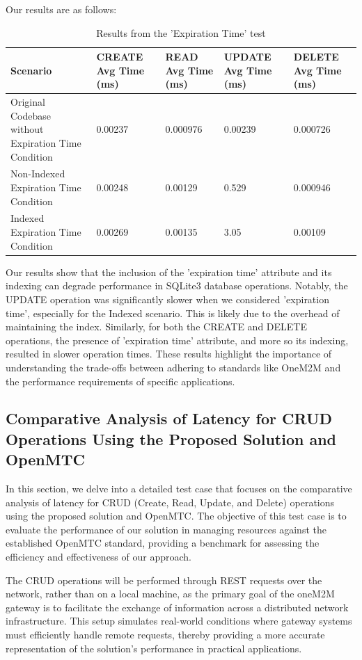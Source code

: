 \documentclass[a4paper,fleqn]{cas-dc}
\begin{document}
Our results are as follows:

\begin{table}[h]
\scriptsize
\centering
\caption{Results from the 'Expiration Time' test}
\begin{tabular}{l p{2cm} p{2cm} p{2cm} p{2cm}}
\hline
\textbf{Scenario} & \textbf{CREATE Avg Time (ms)} & \textbf{READ Avg Time (ms)} & \textbf{UPDATE Avg Time (ms)} & \textbf{DELETE Avg Time (ms)}\\ \hline \hline
Original Codebase without Expiration Time Condition & 0.00237 & 0.000976 & 0.00239 & 0.000726\\
Non-Indexed Expiration Time Condition & 0.00248 & 0.00129 & 0.529 & 0.000946\\ 
Indexed Expiration Time Condition & 0.00269 & 0.00135 & 3.05 & 0.00109\\ \hline
\end{tabular}
\end{table}


Our results show that the inclusion of the 'expiration time' attribute and its indexing can degrade performance in SQLite3 database operations. Notably, the UPDATE operation was significantly slower when we considered 'expiration time', especially for the Indexed scenario. This is likely due to the overhead of maintaining the index. Similarly, for both the CREATE and DELETE operations, the presence of 'expiration time' attribute, and more so its indexing, resulted in slower operation times. These results highlight the importance of understanding the trade-offs between adhering to standards like OneM2M and the performance requirements of specific applications. 

\subsection{Comparative Analysis of Latency for CRUD Operations Using the Proposed Solution and OpenMTC}

In this section, we delve into a detailed test case that focuses on the comparative analysis of latency for CRUD (Create, Read, Update, and Delete) operations using the proposed solution and OpenMTC. The objective of this test case is to evaluate the performance of our solution in managing resources against the established OpenMTC standard, providing a benchmark for assessing the efficiency and effectiveness of our approach.

The CRUD operations will be performed through REST requests over the network, rather than on a local machine, as the primary goal of the oneM2M gateway is to facilitate the exchange of information across a distributed network infrastructure. This setup simulates real-world conditions where gateway systems must efficiently handle remote requests, thereby providing a more accurate representation of the solution's performance in practical applications.
\end{document}
